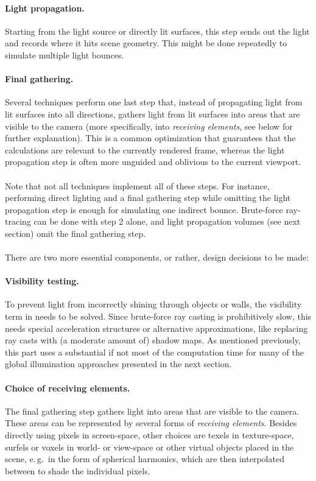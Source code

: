 \paragraph{Light propagation.}
Starting from the light source or directly lit surfaces, this step sends out the light and records where it hits scene geometry. This might be done repeatedly to simulate multiple light bounces.

\paragraph{Final gathering.}
Several techniques perform one last step that, instead of propagating light from lit surfaces into all directions, gathers light from lit surfaces into areas that are visible to the camera (more specifically, into \textit{receiving elements}, see below for further explanation). This is a common optimization that guarantees that the calculations are relevant to the currently rendered frame, whereas the light propagation step is often more unguided and oblivious to the current viewport.
\\
\\
Note that not all techniques implement all of these steps. For instance, performing direct lighting and a final gathering step while omitting the light propagation step is enough for simulating one indirect bounce. Brute-force ray-tracing can be done with step 2 alone, and light propagation volumes (see next section) omit the final gathering step.
\\
\\
There are two more essential components, or rather, design decisions to be made:

\paragraph{Visibility testing.}
To prevent light from incorrectly shining through objects or walls, the visibility term in  needs to be solved. Since brute-force ray casting is prohibitively slow, this needs special acceleration structures or alternative approximations, like replacing ray casts with (a moderate amount of) shadow maps. As mentioned previously, this part uses a substantial if not most of the computation time for many of the global illumination approaches presented in the next section.

\paragraph{Choice of receiving elements.}
The final gathering step gathers light into areas that are visible to the camera. These areas can be represented by several forms of \textit{receiving elements}. Besides directly using pixels in screen-space, other choices are texels in texture-space, surfels or voxels in world- or view-space or other virtual objects placed in the scene, e.\,g.\ in the form of spherical harmonics, which are then interpolated between to shade the individual pixels.

